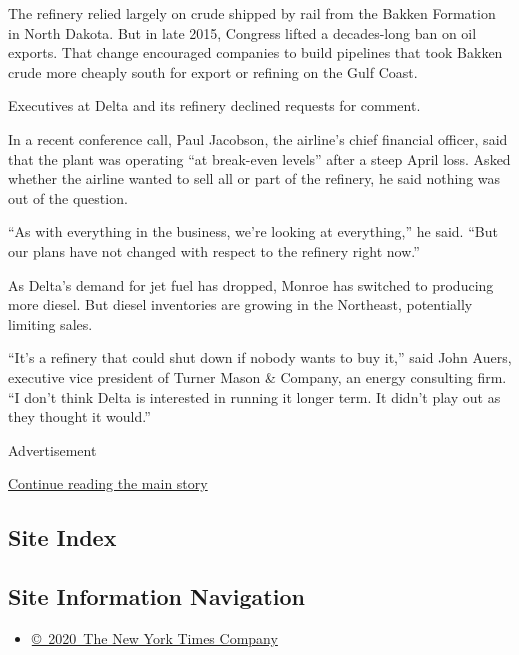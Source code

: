 The refinery relied largely on crude shipped by rail from the Bakken
Formation in North Dakota. But in late 2015, Congress lifted a
decades-long ban on oil exports. That change encouraged companies to
build pipelines that took Bakken crude more cheaply south for export or
refining on the Gulf Coast.

Executives at Delta and its refinery declined requests for comment.

In a recent conference call, Paul Jacobson, the airline's chief
financial officer, said that the plant was operating ``at break-even
levels'' after a steep April loss. Asked whether the airline wanted to
sell all or part of the refinery, he said nothing was out of the
question.

``As with everything in the business, we're looking at everything,'' he
said. ``But our plans have not changed with respect to the refinery
right now.''

As Delta's demand for jet fuel has dropped, Monroe has switched to
producing more diesel. But diesel inventories are growing in the
Northeast, potentially limiting sales.

``It's a refinery that could shut down if nobody wants to buy it,'' said
John Auers, executive vice president of Turner Mason \& Company, an
energy consulting firm. ``I don't think Delta is interested in running
it longer term. It didn't play out as they thought it would.''

Advertisement

\protect\hyperlink{after-bottom}{Continue reading the main story}

\hypertarget{site-index}{%
\subsection{Site Index}\label{site-index}}

\hypertarget{site-information-navigation}{%
\subsection{Site Information
Navigation}\label{site-information-navigation}}

\begin{itemize}
\tightlist
\item
  \href{https://help.nytimes3xbfgragh.onion/hc/en-us/articles/115014792127-Copyright-notice}{©~2020~The
  New York Times Company}
\end{itemize}

